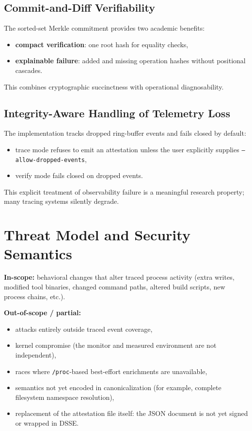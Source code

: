 \documentclass[11pt]{article}
\begin{document}
\subsection{Commit-and-Diff Verifiability}
The sorted-set Merkle commitment provides two academic benefits:
\begin{itemize}
  \item \textbf{compact verification}: one root hash for equality checks,
  \item \textbf{explainable failure}: added and missing operation hashes without positional cascades.
\end{itemize}
This combines cryptographic succinctness with operational diagnosability.

\subsection{Integrity-Aware Handling of Telemetry Loss}
The implementation tracks dropped ring-buffer events and fails closed by default:
\begin{itemize}
  \item trace mode refuses to emit an attestation unless the user explicitly supplies \texttt{--allow-dropped-events},
  \item verify mode fails closed on dropped events.
\end{itemize}
This explicit treatment of observability failure is a meaningful research property; many tracing systems silently degrade.

\section{Threat Model and Security Semantics}
\textbf{In-scope:} behavioral changes that alter traced process activity (extra writes, modified tool binaries, changed command paths, altered build scripts, new process chains, etc.).

\textbf{Out-of-scope / partial:}
\begin{itemize}
  \item attacks entirely outside traced event coverage,
  \item kernel compromise (the monitor and measured environment are not independent),
  \item races where \texttt{/proc}-based best-effort enrichments are unavailable,
  \item semantics not yet encoded in canonicalization (for example, complete filesystem namespace resolution),
  \item replacement of the attestation file itself: the JSON document is not yet signed or wrapped in DSSE.
\end{itemize}
\end{document}
